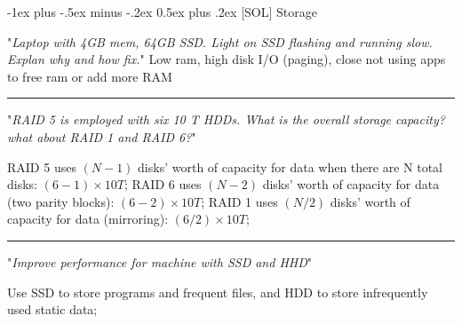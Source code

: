 \documentclass[a4paper]{article}
\makeatletter
\renewcommand{\section}{\@startsection{section}{1}{0mm}%
                                {-1ex plus -.5ex minus -.2ex}%
                                {0.5ex plus .2ex}%
                                {\normalfont\normalsize\bfseries}}
\makeatother
\begin{document}
\begin{multicols*}{2}
  \section{[SOL] Storage}

  "\textit{Laptop with 4GB mem, 64GB SSD. Light on SSD flashing and running slow. Explan why and how fix.}"
  Low ram, high disk I/O (paging), close not using apps to free ram or add more RAM

  \rule{1\linewidth}{0.4pt}

  "\textit{RAID 5 is employed with six 10 T HDDs. What is the overall storage capacity? what about RAID 1 and RAID 6?}"

  RAID 5 uses $(N-1)$ disks' worth of capacity for data when there are N total disks: $(6-1)\times10T$; RAID 6 uses $(N-2)$ disks' worth of capacity for data (two parity blocks): $(6-2)\times10T$; RAID 1 uses $(N/2)$ disks' worth of capacity for data (mirroring): $(6/2)\times10T$;

  \rule{1\linewidth}{0.4pt}

  "\textit{Improve performance for machine with SSD and HHD}"

  Use SSD to store programs and frequent files, and HDD to store infrequently used static data;


\end{multicols*}
\end{document}
